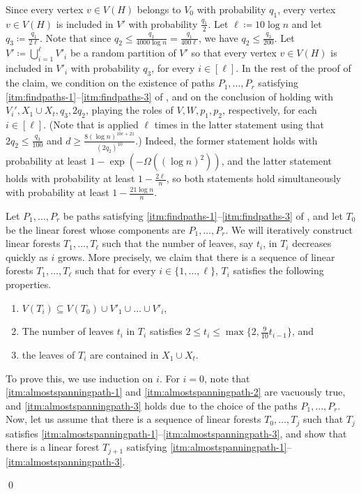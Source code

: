 \documentclass[10pt]{article}
\theoremstyle{plain}
\numberwithin{theorem}{section}
\theoremstyle{definition}
\theoremstyle{remark}
\renewenvironment{proof}[1][]{\begin{trivlist}
\item[\hspace{\labelsep}{\bf\noindent Proof#1.\/}] }{\qed\end{trivlist}}
\theoremstyle{plain}
\begin{document}
	\begin{proof}
		Since every vertex $v \in V(H)$ belongs to $V_0$ with probability $q_1$, every vertex $v \in V(H)$ is included in $V'$ with probability $\frac{q_1}{2}$. Let $\ell \coloneqq 10 \log n$ and let $q_3 \coloneqq \frac{q_1}{2\ell}$. Note that since $q_2 \le \frac{q_1}{4000 \log n} = \frac{q_1}{400 \ell}$, we have $q_2 \le \frac{q_3}{200}$. 
		Let $V' \coloneqq \bigcup_{i = 1}^{\ell} V'_i$ be a random partition of $V'$ so that every vertex $v \in V(H)$ is included in $V'_i$ with probability $q_3$, for every $i \in [\ell]$. 
		In the rest of the proof of the claim, we condition on the existence of paths $P_1, \ldots, P_r$ satisfying \ref{itm:findpaths-1}--\ref{itm:findpaths-3} of , and on the conclusion of  holding with $V_i', X_1 \cup X_t, q_3, 2q_2$, playing the roles of $V, W, p_1, p_2$, respectively, for each $i \in [\ell]$. (Note that  is applied $\ell$ times in the latter statement using that $2q_2 \le \frac{q_3}{100}$ and $d \ge \frac{8 (\log n)^{10c+21}}{(2q_2)^{10}}$.) 
		Indeed, the former statement holds with probability at least $1 - \exp\left(-\Omega\left((\log n)^{2}\right)\right)$, and the latter statement holds with probability at least $1 - \frac{2\ell}{n}$, so both statements hold simultaneously with probability at least $1 - \frac{21 \log n}{n}$.

		Let $P_1, \ldots, P_r$ be paths satisfying \ref{itm:findpaths-1}--\ref{itm:findpaths-3} of , and let $T_0$ be the linear forest whose components are $P_1, \ldots, P_r$.
		We will iteratively construct linear forests $T_1, \ldots, T_{\ell}$ such that the number of leaves, say $t_i$, in $T_i$ decreases quickly as $i$ grows. More precisely, we claim that there is a sequence of linear forests $T_1, \ldots, T_{\ell}$ such that for every $i \in \{1, \ldots, \ell\}$, $T_i$ satisfies the following properties.
  
		\begin{enumerate}[label = \rm(F\arabic*)]
			\item \label{itm:almostspanningpath-1}
				$V(T_i) \subseteq V(T_0) \cup V'_1 \cup \ldots \cup V'_i$, 
			\item \label{itm:almostspanningpath-2}
				The number of leaves $t_i$ in $T_i$ satisfies $2 \le t_{i} \le \max\{2, \frac{9}{10} t_{i-1}\}$, and
			\item \label{itm:almostspanningpath-3}
				the leaves of $T_i$ are contained in $X_1 \cup X_t$.
		\end{enumerate}
		To prove this, we use induction on $i$. For $i = 0$, note that \ref{itm:almostspanningpath-1} and \ref{itm:almostspanningpath-2} are vacuously true, and \ref{itm:almostspanningpath-3} holds due to the choice of the paths $P_1, \ldots, P_r$. Now, let us assume that there is a sequence of linear forests $T_0, \ldots, T_j$ such that $T_j$ satisfies \ref{itm:almostspanningpath-1}--\ref{itm:almostspanningpath-3}, and show that there is a linear forest $T_{j+1}$ satisfying \ref{itm:almostspanningpath-1}--\ref{itm:almostspanningpath-3}.


\end{proof}
\end{document}
